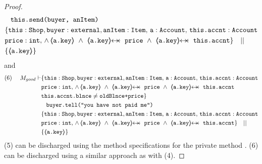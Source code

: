 \begin{proof}
\begin{align*}
		  		&\;\;\; \prg{this.send(buyer, anItem)}\ \\  
		  		& \{  \prg{this}:\prg{Shop}, \prg{buyer} : \prg{external}, \prg{anItem} : \prg{Item},\, \prg{a}:\prg{Account},\, \prg{this.accnt}:\prg{Account}\\
				& \prg{price} : \prg{int},\,
				  \wedge\, 
				  {\inside{\prg{a.key}}}\ \wedge\ 
				  \protectedFrom{\prg{a.key}}{\prg{price}}\ \wedge\ 
				   \protectedFrom{\prg{a.key}}{\prg{this.accnt}}\} \ \ \  || \ \ \ \\
		  		& \{ {\inside{\prg{a.key}}} \}
\end{align*}
\normalsize
and 
\small
\begin{align*}
\text{(6)}  \ \ \ \ M_{good} \vdash & \{  \prg{this}:\prg{Shop}, \prg{buyer} : \prg{external}, \prg{anItem} : \prg{Item},\, \prg{a}:\prg{Account},\, \prg{this.accnt}:\prg{Account}\\
				& \prg{price} : \prg{int},\,
				  \wedge\, 
				  {\inside{\prg{a.key}}}\ \wedge\ 
				  \protectedFrom{\prg{a.key}}{\prg{price}}\ \wedge\ 
				   \protectedFrom{\prg{a.key}}{\prg{this.accnt}} \\
				& \prg{this.accnt.blnce} \neq \prg{oldBlnce+price}\} \\
		  		&\;\;\; \prg{buyer.tell("you have not paid me")}\ \\  
		  		& \{  \prg{this}:\prg{Shop}, \prg{buyer} : \prg{external}, \prg{anItem} : \prg{Item},\, \prg{a}:\prg{Account},\, \prg{this.accnt}:\prg{Account}\\
				& \prg{price} : \prg{int},\,
				  \wedge\, 
				  {\inside{\prg{a.key}}}\ \wedge\ 
				  \protectedFrom{\prg{a.key}}{\prg{price}}\ \wedge\ 
				   \protectedFrom{\prg{a.key}}{\prg{this.accnt}}\} \ \ \  || \ \ \ \\
		  		& \{ {\inside{\prg{a.key}}} \}
\end{align*}
\normalsize
(5) can be discharged using the method specifications for the private method . (6) can be discharged using a similar approach as with (4).


\end{proof}
